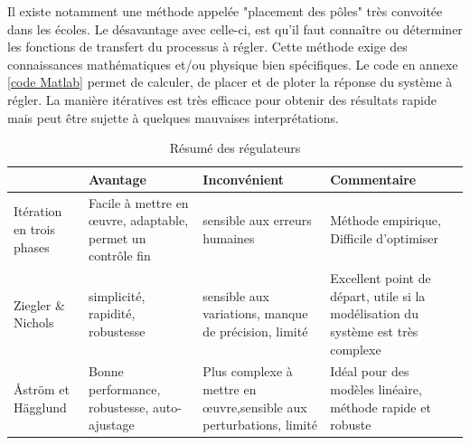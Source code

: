 Il existe notamment une méthode appelée "placement des pôles" très convoitée dans les écoles. Le désavantage avec celle-ci, est qu'il faut connaître ou déterminer les fonctions de transfert du processus à régler. Cette méthode exige des connaissances mathématiques et/ou physique bien spécifiques. Le code en annexe \ref{code Matlab} permet de calculer, de placer et de ploter la réponse du système à régler. La manière itératives est très efficace pour obtenir des résultats rapide mais peut être sujette à quelques mauvaises interprétations. 

\begin{table}[h]
	\begin{center}
		\begin{tabularx}{\textwidth}{|>{\centering\arraybackslash}X|>{\centering\arraybackslash}X|>{\centering\arraybackslash}X|>{\centering\arraybackslash}X|}
			\hline
			& Avantage & Inconvénient & Commentaire \\
			\hline
			Itération en trois phases & Facile à mettre en œuvre, adaptable, permet un contrôle fin & sensible aux erreurs humaines & Méthode empirique, Difficile d'optimiser \\
			\hline
			Ziegler \& Nichols & simplicité, rapidité, robustesse & sensible aux variations, manque de précision, limité & Excellent point de départ, utile si la modélisation du système est très complexe \\
			\hline
			Åström et Hägglund & Bonne performance, robustesse, auto-ajustage & Plus complexe à mettre en œuvre,sensible aux perturbations, limité & Idéal pour des modèles linéaire, méthode rapide et robuste \\
			\hline
		\end{tabularx}
	\end{center}
	\caption{Résumé des régulateurs}
	\label{tab: Résumé des régulateurs}
\end{table}

